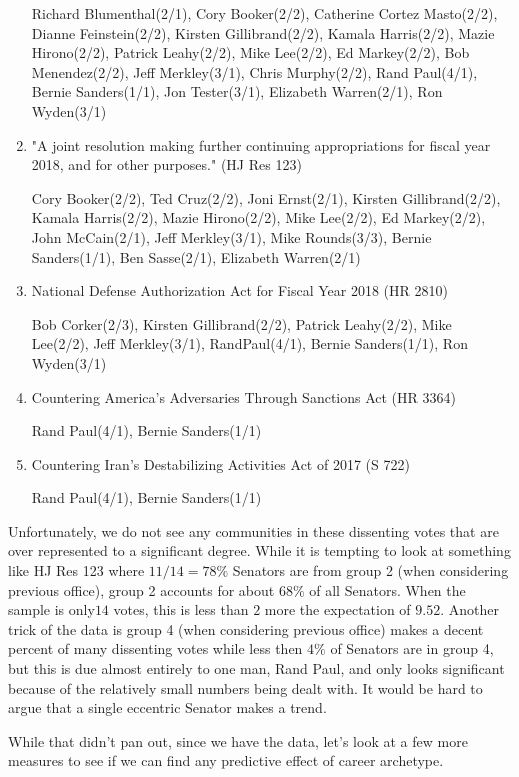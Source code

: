 \documentclass[11pt,twocolumn]{article}
\begin{document}
\begin{enumerate}
Richard Blumenthal(2/1), Cory Booker(2/2), Catherine Cortez Masto(2/2), Dianne Feinstein(2/2), Kirsten Gillibrand(2/2), Kamala Harris(2/2), Mazie Hirono(2/2), Patrick Leahy(2/2), Mike Lee(2/2), Ed Markey(2/2), Bob Menendez(2/2), Jeff Merkley(3/1), Chris Murphy(2/2), Rand Paul(4/1), Bernie Sanders(1/1), Jon Tester(3/1), Elizabeth Warren(2/1), Ron Wyden(3/1)

\item
"A joint resolution making further continuing appropriations for fiscal year 2018, and for other purposes." (HJ Res 123)

Cory Booker(2/2), Ted Cruz(2/2), Joni Ernst(2/1), Kirsten Gillibrand(2/2), Kamala Harris(2/2), Mazie Hirono(2/2), Mike Lee(2/2), Ed Markey(2/2), John McCain(2/1), Jeff Merkley(3/1), Mike Rounds(3/3), Bernie Sanders(1/1), Ben Sasse(2/1), Elizabeth Warren(2/1)

\item
National Defense Authorization Act for Fiscal Year 2018 (HR 2810)

Bob Corker(2/3), Kirsten Gillibrand(2/2), Patrick Leahy(2/2), Mike Lee(2/2), Jeff Merkley(3/1), RandPaul(4/1), Bernie Sanders(1/1), Ron Wyden(3/1)

\item
Countering America's Adversaries Through Sanctions Act (HR 3364)

Rand Paul(4/1), Bernie Sanders(1/1)

\item
Countering Iran's Destabilizing Activities Act of 2017 (S 722)

Rand Paul(4/1), Bernie Sanders(1/1)
\end{enumerate}

Unfortunately, we do not see any communities in these dissenting votes that are over represented to a significant degree. While it is tempting to look at something like HJ Res 123 where $11/14 = 78\%$ Senators are from group 2 (when considering previous office), group 2 accounts for about $68\%$ of all Senators. When the sample is only$14$ votes, this is less than $2$ more the expectation of $9.52$. Another trick of the data is group 4 (when considering previous office) makes a decent percent of many dissenting votes while less then $4\%$ of Senators are in group 4, but this is due almost entirely to one man, Rand Paul, and only looks significant because of the relatively small numbers being dealt with. It would be hard to argue that a single eccentric Senator makes a trend.

While that didn't pan out, since we have the data, let's look at a few more measures to see if we can find any predictive effect of career archetype.
\end{document}
